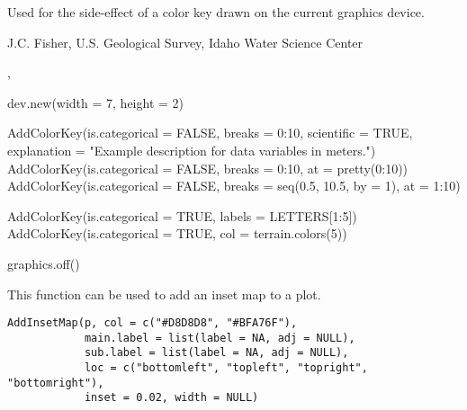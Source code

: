 \documentclass[a4paper]{book}
\begin{document}
%
\begin{Value}
Used for the side-effect of a color key drawn on the current graphics device.
\end{Value}
%
\begin{Author}\relax
J.C. Fisher, U.S. Geological Survey, Idaho Water Science Center
\end{Author}
%
\begin{SeeAlso}\relax
{}, 
\end{SeeAlso}
%
\begin{Examples}
\begin{ExampleCode}
dev.new(width = 7, height = 2)

AddColorKey(is.categorical = FALSE, breaks = 0:10, scientific = TRUE,
            explanation = "Example description for data variables in meters.")
AddColorKey(is.categorical = FALSE, breaks = 0:10, at = pretty(0:10))
AddColorKey(is.categorical = FALSE, breaks = seq(0.5, 10.5, by = 1), at = 1:10)

AddColorKey(is.categorical = TRUE, labels = LETTERS[1:5])
AddColorKey(is.categorical = TRUE, col = terrain.colors(5))

graphics.off()
\end{ExampleCode}
\end{Examples}
%
\begin{Description}\relax
This function can be used to add an inset map to a plot.
\end{Description}
%
\begin{Usage}
\begin{verbatim}
AddInsetMap(p, col = c("#D8D8D8", "#BFA76F"),
            main.label = list(label = NA, adj = NULL),
            sub.label = list(label = NA, adj = NULL),
            loc = c("bottomleft", "topleft", "topright", "bottomright"),
            inset = 0.02, width = NULL)
\end{verbatim}
\end{Usage}
%
\end{document}
